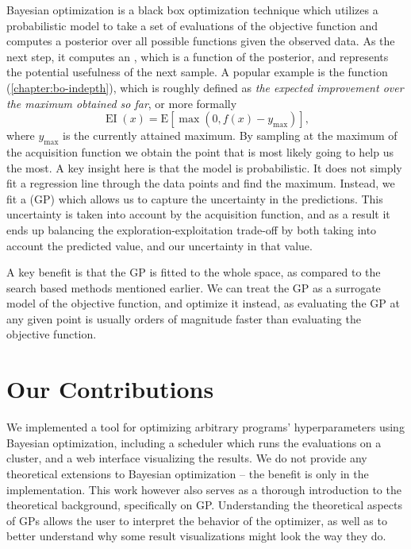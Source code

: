Bayesian optimization \citep{nando-bayesian-out-of-the-loop} is a black box
optimization technique which utilizes a probabilistic model to take a set of
evaluations of the objective function and computes a posterior over all
possible functions given the observed data. As the next step, it computes an
, which is a function of the posterior, and
represents the potential usefulness of the next sample. A popular example is
the  function (\autoref{chapter:bo-indepth}), which is
roughly defined as \emph{the expected improvement over the maximum obtained so
far}, or more formally $$\operatorname{EI}(x) = \mathrm{E}\left[\max(0, f(x) - y_{\max})\right],$$ where $y_{\max}$ is the currently attained maximum. By sampling at the maximum of the acquisition function we obtain the
point that is most likely going to help us the most. A key insight here is that
the model is probabilistic. It does not simply fit a regression line through
the data points and find the maximum.  Instead, we fit a  (GP) which allows us to capture the uncertainty in the
predictions. This uncertainty is taken into account by the acquisition
function, and as a result it ends up balancing the exploration-exploitation
trade-off by both taking into account the predicted value, and our uncertainty
in that value.

A key benefit is that the GP is fitted to the whole space, as compared to the search based methods mentioned earlier. We can treat the GP as a surrogate model of the objective function, and optimize it instead, as evaluating the GP at any given point is usually orders of magnitude faster than evaluating the objective function.


\section{Our Contributions}

We implemented a tool for optimizing arbitrary programs' hyperparameters using
Bayesian optimization, including a scheduler which runs the evaluations on a
cluster, and a web interface visualizing the results. We do not provide any
theoretical extensions to Bayesian optimization -- the benefit is only in the
implementation. This work however also serves as a thorough introduction to the
theoretical background, specifically on GP. Understanding the theoretical
aspects of GPs allows the user to interpret the behavior of the optimizer, as
well as to better understand why some result visualizations might look the way
they do.

